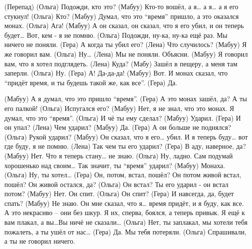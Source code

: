  (Перепад)
 (Ольга)  Подожди, кто это?
 (Мабуу)  Кто-то вошёл, а я… а я… а я его стукнул!
 (Ольга)  Кто?
 (Мабуу)  Думал, что это ``время''  пришло, а это оказался монах.
 (Ольга)  Ага!
 (Мабуу)  А он сказал, он сказал, что я его убил,  и он теперь будет… Вот, кем - я не помню.
 (Ольга)  Подожди, ну-ка, ну-ка ещё раз.  Мы ничего не поняли. 
 (Гера)   А когда ты убил его?
 (Лена)   Что случилось?
 (Мабуу)  Я же говорил вам.
 (Ольга)  Ну…
 (Лена)   Мы не поняли. Объясни.
 (Мабуу)  Я говорил вам, что я хотел подглядеть.
 (Лена)   Куда?
 (Мабу)   Зашёл в пещеру, а меня там заперли.
 (Ольга)  Ну.
 (Гера)   А! Да-да-да!
 (Мабуу)  Вот. И монах сказал, что ``придёт время, и ты будешь такой же, как все''.
 (Гера)   Да.
  
 (Мабуу)  А я думал, что это пришло ``время''. 
 (Гера)   А это монах зашёл, да?  А ты его палкой!
 (Ольга)  Испугался его?
 (Мабуу)  Нет, я не знал, что это монах. Я думал, что это ``время''.
 (Ольга)  И чё ты ему сделал?
 (Мабуу)  Ударил.
 (Гера)   И он упал?
 (Лена)   Чем ударил?
 (Мабуу)  Да.
 (Гера)   А он больше не поднялся?
 (Ольга)  Рукой ударил?
 (Мабуу)  Он сказал, что я его… убил. И я теперь буду… вот где  буду, я не помню.
 (Лена)   Так чем ты его ударил?
 (Гера)   В аду, наверное, да?
 (Мабуу)  Нет. Что я теперь стану… не знаю.
 (Ольга)  Ну, ладно. Сам подумай хорошенько над своим… Так значит, ты ``время'' ударил?
 (Мабуу)  Монаха.
 (Ольга)  Ну, ты хотел…
 (Гера)   Он, потом, встал, пошёл? Он потом живой встал, пошёл? Он живой остался, да?
 (Ольга)  Он встал? Ты его ударил - он встал потом?
 (Мабуу)  Нет. Он спит.
 (Ольга)  Он спит?
 (Гера)   И навсегда, да, будет спать?
 (Мабуу)  Не знаю. Он мне сказал, что я… время придёт, и я буду, как все. А это некрасиво – они  без шкур. Я их, сперва, боялся, а теперь привык. Я ещё к вам плакал, а вы…Вы ничё не сказали…
 (Ольга)  Нет, ты заплакал, мы хотели тебя пожалеть, а ты ушёл от нас…
 (Гера)   Да. Мы тебя потеряли.
 (Ольга)  Спрашивали, а ты не говорил  ничего. 
  
